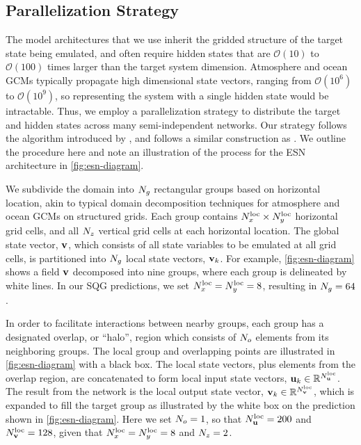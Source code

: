 \documentclass[draft]{agujournal2019}
\newcommand{\citet}{\citeA}
\begin{document}
\subsection{Parallelization Strategy}
\label{subsec:parallelization}

The model architectures that we use inherit the gridded structure of the target
state being emulated, and often require hidden states that are
$\mathcal{O}(10)$ to $\mathcal{O}(100)$ times larger than the target system dimension.
Atmosphere and ocean GCMs typically propagate high dimensional state vectors, ranging from $\mathcal{O}(10^6)$ to $\mathcal{O}(10^9)$,
so representing the system with a single hidden state would be intractable.
Thus, we employ a parallelization strategy to distribute the target and hidden
states across many semi-independent networks.
Our strategy follows the algorithm introduced by \citet{pathak_model-free_2018},
and follows a similar construction as \citet{arcomano_machine_2020}.
We outline the procedure here and note an illustration of the process for
the ESN architecture in \cref{fig:esn-diagram}.

We subdivide the domain into $N_{g}$ rectangular groups based on horizontal location,
akin to typical domain decomposition techniques for atmosphere and ocean
GCMs on structured grids.
Each group contains
$N_{x}^\text{loc}\times N_{y}^\text{loc}$ horizontal grid cells, and all $N_{z}$
vertical grid cells at each horizontal location.
The global state vector, $\mathbf{v}$, which consists of all state variables to be
emulated at all grid cells, is partitioned into $N_{g}$ local state vectors,
$\mathbf{v}_{k}$.
For example, \cref{fig:esn-diagram} shows a field $\mathbf{v}$ decomposed into nine
groups, where each group is delineated by white lines.
In our SQG predictions, we set $N_{x}^\text{loc} = N_{y}^\text{loc} = 8$, resulting in
$N_{g}=64$.

In order to facilitate interactions between nearby groups, each group has a designated overlap, or ``halo'', region which consists of $N_{o}$ elements
from its neighboring groups.
The local group and overlapping points are illustrated in \cref{fig:esn-diagram}
with a black box.
The local state vectors, plus elements from the overlap region, are concatenated
to form local input state vectors,
$\mathbf{u}_{k}\in\mathbb{R}^{N_{\mathbf{u}}^\text{loc}}$.
The result from the network is the local output state vector,
$\mathbf{v}_{k}\in\mathbb{R}^{N_{\mathbf{v}}^\text{loc}}$,
which is expanded to fill the target group as illustrated by the
white box on the prediction shown in \cref{fig:esn-diagram}.
Here we set $N_{o}=1$, so that $N_{\mathbf{u}}^\text{loc}=200$ and
$N_{\mathbf{v}}^\text{loc}=128$, given that $N_{x}^\text{loc}=N_{y}^\text{loc}=8$ and $N_{z}=2$.
\end{document}
